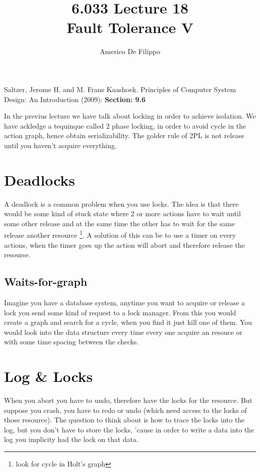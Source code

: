 \documentclass{article}
\title{6.033 Lecture 18 \\ Fault Tolerance V}
\author{Americo De Filippo}
\begin{document}
 
  \maketitle
  \begin{thebibliography}{9}
    Saltzer, Jerome H. and M. Frans Kaashoek. Principles of Computer System Design: An Introduction (2009): \textbf{Section: 9.6}
  \end{thebibliography}
  \maketitle
  In the previus lecture we have talk about locking in order to achieve isolation.
  We have ackledge a tequinque called 2 phase locking, in order to avoid cycle in the 
  action graph, hence obtain serializability. The golder rule of 2PL is not release until
  you haven't acquire everything.
  \section{Deadlocks}
    A deadlock is a common problem when you use locks. The idea is that there would be some 
    kind of stuck state where 2 or more actions have to wait until some other release and
    at the same time the other has to wait for the same release another resource \footnote{
    look for cycle in Holt's graph}. A solution of this can be to use a timer on every actions, 
    when the timer goes up the action will abort and therefore release the resourse. 
    \subsection{Waits-for-graph}
      Imagine you have a database system, anytime you want to acquire or release a lock you
      send some kind of request to a lock manager. From this you would create a graph 
      and search for a cycle, when you find it just kill one of them. You would look into the
      data structure every time every one acquire an resouce or with some time spacing between
      the checks.
  \section{Log \& Locks}
    When you abort you have to undo, therefore have the locks for the resource. But suppose
    you crash, you have to redo or undo (which need access to the locks of those resource). 
    The question to think about is how to trace the locks into the log, but you don't have to 
    store the locks, 'cause in order to write a data into the log you implicity had the 
    lock on that data.
\end{document}
